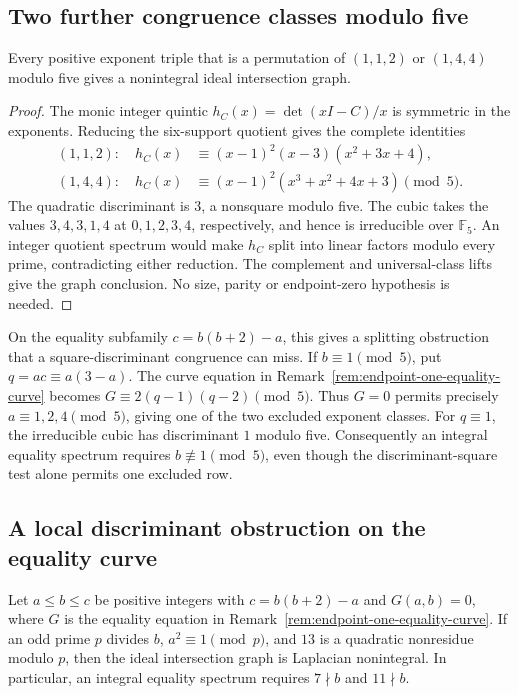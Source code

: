 \subsection{Two further congruence classes modulo five}

\begin{proposition}
\label{prop:mod-five-splitting}
Every positive exponent triple that is a permutation of $(1,1,2)$ or
$(1,4,4)$ modulo five gives a nonintegral ideal intersection graph.
\end{proposition}

\begin{proof}
The monic integer quintic $h_C(x)=\det(xI-C)/x$ is symmetric in the
exponents. Reducing the six-support quotient gives the complete identities
\begin{align*}
 (1,1,2):\quad h_C(x)&\equiv(x-1)^2(x-3)(x^2+3x+4),\\
 (1,4,4):\quad h_C(x)&\equiv(x-1)^2(x^3+x^2+4x+3)
 \pmod5.
\end{align*}
The quadratic discriminant is $3$, a nonsquare modulo five. The cubic
takes the values $3,4,3,1,4$ at $0,1,2,3,4$, respectively, and hence
is irreducible over $\mathbb F_5$. An integer quotient spectrum would
make $h_C$ split into linear factors modulo every prime, contradicting
either reduction. The complement and universal-class lifts give the
graph conclusion. No size, parity or endpoint-zero hypothesis is needed.
\end{proof}

On the equality subfamily $c=b(b+2)-a$, this gives a splitting obstruction
that a square-discriminant congruence can miss. If $b\equiv1\pmod5$, put
$q=ac\equiv a(3-a)$. The curve equation in
Remark~\ref{rem:endpoint-one-equality-curve} becomes
$G\equiv2(q-1)(q-2)\pmod5$. Thus $G=0$ permits precisely
$a\equiv1,2,4\pmod5$, giving one of the two excluded exponent classes.
For $q\equiv1$, the irreducible cubic has discriminant $1$ modulo five.
Consequently an integral equality spectrum requires $b\not\equiv1\pmod5$,
even though the discriminant-square test alone permits one excluded row.

\subsection{A local discriminant obstruction on the equality curve}

\begin{proposition}
\label{prop:equality-local-discriminant}
Let $a\leq b\leq c$ be positive integers with $c=b(b+2)-a$ and
$G(a,b)=0$, where $G$ is the equality equation in
Remark~\ref{rem:endpoint-one-equality-curve}. If an odd prime $p$ divides
$b$, $a^2\equiv1\pmod p$, and $13$ is a quadratic nonresidue modulo $p$,
then the ideal intersection graph is Laplacian nonintegral.
In particular, an integral equality spectrum requires $7\nmid b$ and
$11\nmid b$.
\end{proposition}

